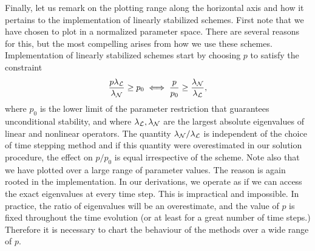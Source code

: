 Finally, let us remark on the plotting range along the horizontal axis and how it pertains to the implementation of linearly stabilized schemes. First note that we have chosen to plot in a normalized parameter space. There are several reasons for this, but the most compelling arises from how we use these schemes. Implementation of linearly stabilized schemes start by choosing $p$ to satisfy the constraint 
\begin{align}
      \frac{p\lambda_{\mathcal{L}}}{\lambda_{\mathcal{N}}}  \geq p_0 
\iff  \frac{p}{p_0} \geq \frac{\lambda_{\mathcal{N}}}{\lambda_{\mathcal{L}}},
\end{align}
where $p_0$ is the lower limit of the parameter restriction that guarantees unconditional stability, and where $\lambda_{\mathcal{L}}, \lambda_{\mathcal{N}}$ are the largest absolute eigenvalues of linear and nonlinear operators. The quantity $\lambda_{\mathcal{N}}/\lambda_{\mathcal{L}}$ is independent of the choice of time stepping method and if this quantity were overestimated in our solution procedure, the effect on $p/p_0$ is equal irrespective of the scheme. Note also that we have plotted over a large range of parameter values. The reason is again rooted in the implementation. In our derivations, we operate as if we can access the exact eigenvalues at every time step. This is impractical and impossible. In practice, the ratio of eigenvalues will be an overestimate, and the value of $p$ is fixed throughout the time evolution (or at least for a great number of time steps.) Therefore it is necessary to chart the behaviour of the methods over a wide range of $p$.
